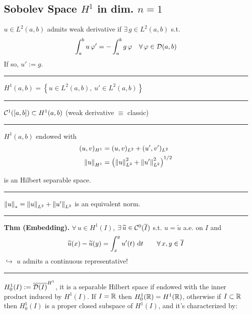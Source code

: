 

\subsection{\color{red}Sobolev Space \texorpdfstring{$H^1$}{C} in dim. \texorpdfstring{$n=1$}{C}}


$u\in L^2(a,b)$ admits weak derivative if $\exists\,g\in L^2(a,b)$ s.t.
\begin{equation*}
\int_a^b u\,\varphi'=-\int_a^b g\,\varphi\quad\forall\, \varphi\in \mathcal{D}(a,b)
\end{equation*}
If so, $u':=g$.

\rule{0.31\textwidth}{0.2pt}
\smallskip

$H^1(a,b) = \left\{ u\in L^2(a,b),\ u'\in L^2(a,b) \right\}$

\rule{0.31\textwidth}{0.2pt}
\smallskip

$\mathcal{C}^1([a,b])\subset H^1(a,b)$ (weak derivative $\equiv$ classic)

\rule{0.31\textwidth}{0.2pt}
\smallskip

$H^1(a,b)$ endowed with
\begin{align*}
(u,v)_{H^1}&=(u,v)_{L^2}+(u',v')_{L^2} \\
\left\lVert u \right\rVert_{H^1}&=\left( \left\lVert u \right\rVert^2_{L^2}+\left\lVert u' \right\rVert^2_{L^2} \right)^{1/2}
\end{align*}

is an Hilbert separable space.

\rule{0.31\textwidth}{0.2pt}
\smallskip

$\left\lVert u \right\rVert_{*}=\left\lVert u \right\rVert_{L^2}+\left\lVert u' \right\rVert
_{L^2}$ is an equivalent norm.

\rule{0.31\textwidth}{0.2pt}
\smallskip

\textbf{Thm (Embedding).} $\forall\,u\in H^1(I)$, $\exists\,\widetilde{u}\in\mathcal{C}^0(\overline{I})$ s.t. $u=\widetilde{u}$ a.e. on $I$ and 
\begin{equation*}
\widetilde{u}(x)-\widetilde{u}(y)=\int_x^y u'(t)\  \mathrm{d} t\qquad\forall\, x,y\in \overline{I}
\end{equation*}
$\hookrightarrow$ $u$ admits a continuous representative!

\rule{0.31\textwidth}{0.2pt}
\smallskip

$H^1_0(I):=\overline{\mathcal{D}(I)}^{H^1}$, it is a separable Hilbert space if endowed with the inner product induced by $H^1(I)$. If $I=\mathbb{R}$ then $H^1_0(\mathbb{R})=H^1(\mathbb{R})$, otherwise if $I\subset\mathbb{R}$ then $H^1_0(I)$ is a proper closed subspace of $H^1(I)$, and it's characterized by:

